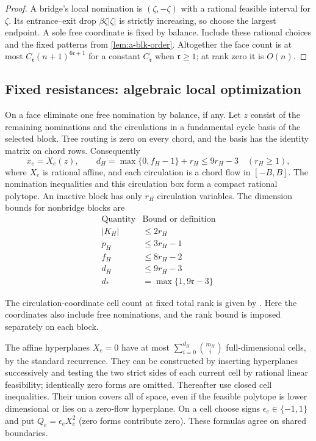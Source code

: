 \begin{proof}
A bridge's local nomination is $(\zeta,-\zeta)$ with a rational feasible
interval for $\zeta$. Its entrance--exit drop $\beta\zeta|\zeta|$
is strictly increasing, so choose the largest endpoint. A sole free
coordinate is fixed by balance. Include these rational choices and
the fixed patterns from \cref{lem:a-blk-order}. Altogether the face
count is at most $C_{\mathfrak r}(n+1)^{6\mathfrak r+1}$ for a constant
$C_{\mathfrak r}$ when $\mathfrak r\ge1$; at rank zero it is $O(n)$.
\end{proof}

\subsection{Fixed resistances: algebraic local optimization}
On a face eliminate one free nomination by balance, if any. Let $z$
consist of the remaining nominations and the circulations in a
fundamental cycle basis of the selected block. Tree routing is zero
on every chord, and the basis has the identity matrix on chord rows.
Consequently
\begin{equation}
 x_e=X_e(z),\qquad
 d_H=\max\{0,f_H-1\}+r_H\le9r_H-3\quad(r_H\ge1),
 \label{eq:a-blk-core}
\end{equation}
where $X_e$ is rational affine, and each circulation is a chord flow
in $[-B,B]$. The nomination inequalities and this circulation box
form a compact rational polytope. An inactive block has only $r_H$
circulation variables. The dimension bounds for nonbridge blocks are
\[
\begin{array}{c|c}
\text{Quantity} & \text{Bound or definition}\\ \hline
|K_H| & \le 2r_H\\
p_H & \le 3r_H-1\\
f_H & \le 8r_H-2\\
d_H & \le 9r_H-3\\
d_* & =\max\{1,9\mathfrak r-3\}
\end{array}
\]

The circulation-coordinate cell count at fixed total rank is given by
\citet[Proposition 4.7 (arXiv v1 numbering)]{amann2018-deciding-robust-feasibility-and-infeasibility}.
Here the coordinates also include free nominations, and the rank bound
is imposed separately on each block.

The affine hyperplanes $X_e=0$ have at most
$\sum_{i=0}^{d_H}\binom{m_H}{i}$ full-dimensional cells, by the
standard recurrence. They can be constructed by inserting hyperplanes
successively and testing the two strict sides of each current cell by
rational linear feasibility; identically zero forms are omitted.
Thereafter use closed cell inequalities. Their union covers all of
space, even if the feasible polytope is lower dimensional or lies on a
zero-flow hyperplane. On a cell choose signs
$\epsilon_e\in\{-1,1\}$ and put $Q_e=\epsilon_e X_e^2$ (zero forms contribute
zero). These formulas agree on shared boundaries.


